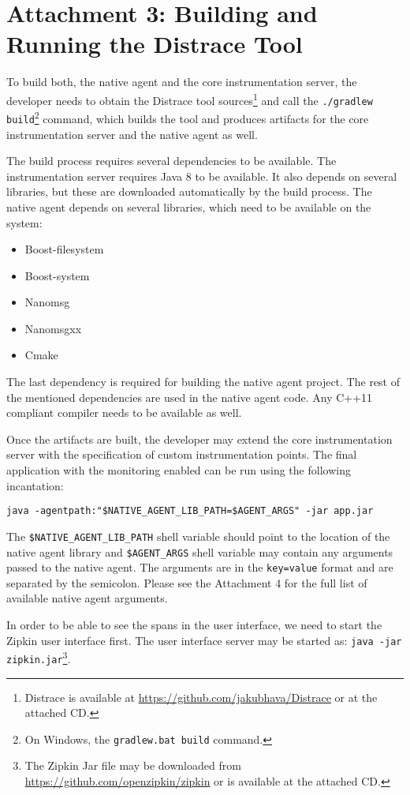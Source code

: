 \chapter*{Attachment 3: Building and Running the Distrace Tool}
To build both, the native agent and the core instrumentation server, the developer needs to obtain the Distrace tool sources\footnote{Distrace is available at \url{https://github.com/jakubhava/Distrace} or at the attached CD.} and call the \texttt{./gradlew build}\footnote{On Windows, the \texttt{gradlew.bat build} command.} command, which builds the tool and produces artifacts for the core instrumentation server and the native agent as well. 

The build process requires several dependencies to be available. The instrumentation server requires Java 8 to be available. It also depends on several libraries, but these are downloaded automatically by the build process. The native agent depends on several libraries, which need to be available on the system:
\begin{itemize}
	\item Boost-filesystem
	\item Boost-system
	\item Nanomsg
	\item Nanomsgxx
	\item Cmake
\end{itemize}
The last dependency is required for building the native agent project. The rest of the mentioned dependencies are used in the native agent code. Any C++11 compliant compiler needs to be available as well.

Once the artifacts are built, the developer may extend the core instrumentation server with the specification of custom instrumentation points. The final application with the monitoring enabled can be run using the following incantation:

\texttt{java -agentpath:"\$NATIVE\_AGENT\_LIB\_PATH=\$AGENT\_ARGS" -jar app.jar}

The \texttt{\$NATIVE\_AGENT\_LIB\_PATH} shell variable should point to the location of the native agent library and \texttt{\$AGENT\_ARGS} shell variable may contain any arguments passed to the native agent. The arguments are in the \texttt{key=value} format and are separated by the semicolon. Please see the Attachment 4 for the full list of available native agent arguments.

In order to be able to see the spans in the user interface, we need to start the Zipkin user interface first. The user interface server may be started as: \texttt{java -jar zipkin.jar}\footnote{The Zipkin Jar file may be downloaded from \url{https://github.com/openzipkin/zipkin} or is available at the attached CD.}.

